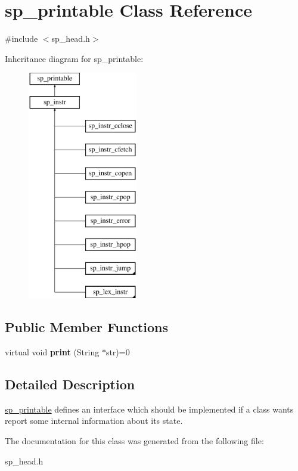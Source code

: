 \hypertarget{classsp__printable}{}\section{sp\+\_\+printable Class Reference}
\label{classsp__printable}


{\ttfamily \#include $<$sp\+\_\+head.\+h$>$}

Inheritance diagram for sp\+\_\+printable\+:\begin{figure}[H]
\begin{center}
\leavevmode
\includegraphics[height=10.000000cm]{classsp__printable}
\end{center}
\end{figure}
\subsection*{Public Member Functions}
\begin{DoxyCompactItemize}
\item 
\mbox{\label{classsp__printable_a08112b70face9457617ad301384cffce}} 
virtual void {\bfseries print} (String $\ast$str)=0
\end{DoxyCompactItemize}


\subsection{Detailed Description}
\mbox{\hyperlink{classsp__printable}{sp\+\_\+printable}} defines an interface which should be implemented if a class wants report some internal information about its state. 

The documentation for this class was generated from the following file\+:\begin{DoxyCompactItemize}
\item 
sp\+\_\+head.\+h\end{DoxyCompactItemize}
